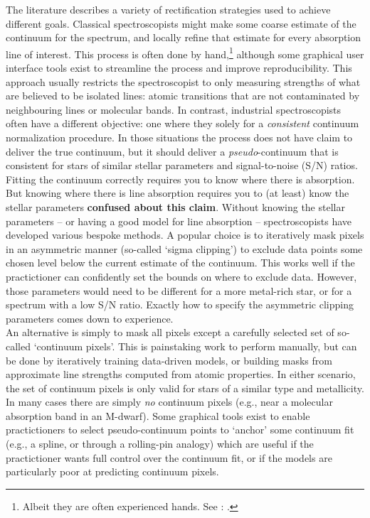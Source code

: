 \documentclass[modern]{aastex631}
\newcommand{\ajw}[1]{\textbf{#1}}
\begin{document}
The literature describes a variety of rectification strategies used to achieve different goals. Classical spectroscopists might make some coarse estimate of the continuum for the spectrum, and locally refine that estimate for every absorption line of interest. This process is often done by hand,\footnote{Albeit they are often experienced hands. See \citet{Bensby:2014}: .} although some graphical user interface tools exist to streamline the process and improve reproducibility. This approach usually restricts the spectroscopist to only measuring strengths of what are believed to be isolated lines: atomic transitions that are not contaminated by neighbouring lines or molecular bands. In contrast, industrial spectroscopists often have a different objective: one where they solely for a \emph{consistent} continuum normalization procedure. In those situations the process does not have claim to deliver the true continuum, but it should deliver a \emph{pseudo}-continuum that is consistent for stars of similar stellar parameters and signal-to-noise (S/N) ratios.\\

Fitting the continuum correctly requires you to know where there is absorption. But knowing where there is line absorption requires you to (at least) know the stellar parameters \ajw{confused about this claim}. Without knowing the stellar parameters -- or having a good model for line absorption -- spectroscopists have developed various bespoke methods. A popular choice is to iteratively mask pixels in an asymmetric manner (so-called `sigma clipping') to exclude data points some chosen level below the current estimate of the continuum. This works well if the practictioner can confidently set the bounds on where to exclude data. However, those parameters would need to be different for a more metal-rich star, or for a spectrum with a low S/N ratio. Exactly how to specify the asymmetric clipping parameters comes down to experience.\\

An alternative is simply to mask all pixels except a carefully selected set of so-called `continuum pixels'. This is painstaking work to perform manually, but can be done by iteratively training data-driven models, or building masks from approximate line strengths computed from atomic properties. In either scenario, the set of continuum pixels is only valid for stars of a similar type and metallicity. In many cases there are simply \emph{no} continuum pixels (e.g., near a molecular absorption band in an M-dwarf). Some graphical tools exist to enable practictioners to select pseudo-continuum points to `anchor' some continuum fit (e.g., a spline, or through a rolling-pin analogy) which are useful if the practictioner wants full control over the continuum fit, or if the models are particularly poor at predicting continuum pixels.\\
\end{document}
